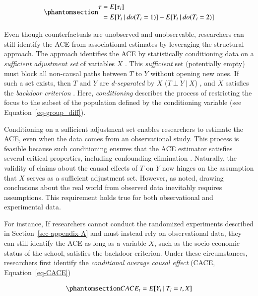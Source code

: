 \documentclass[
  authoryear,
  review,
  1p]{elsarticle}
\begin{document}
\begin{equation}\phantomsection\label{eq-ACE}{
\begin{aligned}
\tau & = E[\tau_{i}] \\
  & = E[Y_{i} \:|\:do(T_{i}=1)]- E[Y_{i} \:|\:do(T_{i}=2)]
\end{aligned}
}\end{equation}

Even though counterfactuals are unobserved and unobservable, researchers
can still identify the ACE from associational estimates by leveraging
the structural approach. The approach identifies the ACE by
statistically conditioning data on a \emph{sufficient adjustment set} of
variables \(X\) \citep{Pearl_2009, Pearl_et_al_2016, Morgan_et_al_2014}.
This \emph{sufficient} set (potentially empty) must block all non-causal
paths between \(T\) to \(Y\) without opening new ones. If such a set
exists, then \(T\) and \(Y\) are \emph{d-separated} by \(X\)
(\(T \:\bot\:Y \:|\:X\)) \citep{Pearl_2009}, and \(X\) satisfies the
\emph{backdoor criterion} \citep[pp 37]{Neal_2020}. Here,
\emph{conditioning} describes the process of restricting the focus to
the subset of the population defined by the conditioning variable
\citep[pp.~32]{Neal_2020} (see Equation~\ref{eq-group_diff}).

Conditioning on a sufficient adjustment set enables researchers to
estimate the ACE, even when the data comes from an observational study.
This process is feasible because such conditioning ensures that the ACE
estimator satisfies several critical properties, including confounding
elimination \citep{Morgan_et_al_2014}. Naturally, the validity of claims
about the causal effects of \(T\) on \(Y\) now hinges on the assumption
that \(X\) serves as a sufficient adjustment set. However, as
\citet[pp.~150]{Kohler_et_al_2019} noted, drawing conclusions about the
real world from observed data inevitably requires assumptions. This
requirement holds true for both observational and experimental data.

For instance, If researchers cannot conduct the randomized experiments
described in Section~\ref{sec-appendix-A} and must instead rely on
observational data, they can still identify the ACE as long as a
variable \(X\), such as the socio-economic status of the school,
satisfies the backdoor criterion. Under these circumstances, researchers
first identify the \emph{conditional average causal effect} (CACE,
Equation~\ref{eq-CACE})

\begin{equation}\phantomsection\label{eq-CACE}{
CACE_{t} = E[Y_{i} \:|\:T_{i}=t, X]
}\end{equation}
\end{document}
